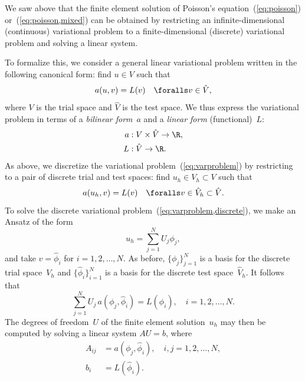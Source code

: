 We saw above that the finite element solution of Poisson's
equation~(\ref{eq:poisson}) or~(\ref{eq:poisson,mixed}) can be
obtained by restricting an infinite-dimensional (continuous) variational problem to
a finite-dimensional (discrete) variational problem and solving a linear system.

To formalize this, we consider a general linear variational problem
written in the following canonical form: find $u \in V$ such that
\begin{equation} \label{eq:varproblem}
  a(u, v) = L(v) \quad \foralls v \in \hat{V},
\end{equation}
where $V$ is the trial space and $\hat{V}$ is the test space. We thus
express the variational problem in terms of a \emph{bilinear form}~$a$
and a \emph{linear form} (functional)~$L$:
\begin{equation}
  \begin{split}
    a &: V \times \hat{V} \rightarrow \R, \\
    L &: \hat{V} \rightarrow \R.
  \end{split}
\end{equation}
As above, we discretize the variational problem~(\ref{eq:varproblem})
by restricting to a pair of discrete trial and test spaces: find $u_h
\in V_h \subset V$ such that
\begin{equation} \label{eq:varproblem,discrete}
  a(u_h, v) = L(v) \quad \foralls v \in \hat{V}_h \subset \hat{V}.
\end{equation}
To solve the discrete variational
problem~(\ref{eq:varproblem,discrete}), we make an Ansatz of the form
\begin{equation} \label{eq:ansatz}
  u_h = \sum_{j=1}^N U_j \phi_j,
\end{equation}
and take $v = \hat{\phi}_i$ for $i = 1,2,\ldots,N$. As before,
$\{\phi_j\}_{j=1}^N$ is a basis for the discrete trial space~$V_h$ and
$\{\hat{\phi}_i\}_{i=1}^N$ is a basis for the discrete test
space~$\hat{V}_h$. It follows that
\begin{equation}
  \sum_{j=1}^N U_j \, a(\phi_j, \hat{\phi}_i) = L(\hat{\phi}_i), \quad i
  = 1,2,\ldots,N.
\end{equation}
The degrees of freedom~$U$ of the finite element solution~$u_h$ may
then be computed by solving a linear system $AU = b$, where
\begin{equation} \label{eq:system}
  \begin{split}
    A_{ij} &= a(\phi_j, \hat{\phi}_i), \quad i, j = 1,2,\ldots,N, \\
    b_i &= L(\hat{\phi}_i).
  \end{split}
\end{equation}

